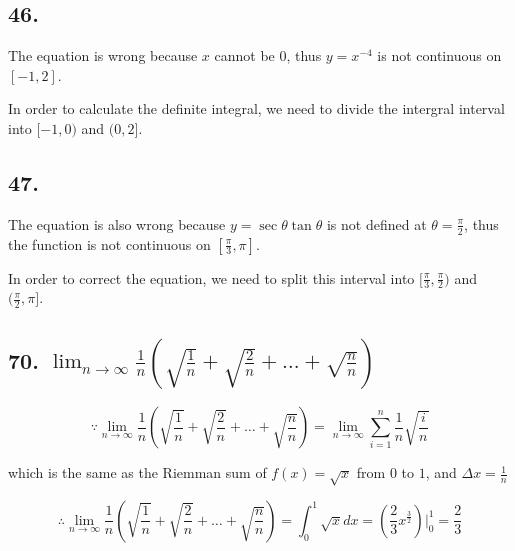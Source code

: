\documentclass{article}
\begin{document}
    \subsection*{46. }

    The equation is wrong because $x$ cannot be $0$, thus $y = x^{-4}$ is not continuous on $[-1, 2]$.

    In order to calculate the definite integral, we need to divide the intergral interval into $[-1, 0)$ and $(0, 2]$.
    
    \subsection*{47. }

    The equation is also wrong because $y = \sec\theta \tan \theta$ is not defined at $\theta = \frac \pi 2$, thus the function is not continuous on $[\frac \pi 3, \pi]$.

    In order to correct the equation, we need to split this interval into $[\frac \pi 3, \frac \pi 2)$ and $(\frac \pi 2, \pi]$.

    \subsection*{70. $\lim_{n \to \infty}\frac 1 n (\sqrt{\frac 1 n} + \sqrt{\frac 2 n} + \dots + \sqrt{\frac n n})$}

    $$\because \lim_{n \to \infty}\frac 1 n (\sqrt{\frac 1 n} + \sqrt{\frac 2 n} + \dots + \sqrt{\frac n n}) = \lim_{n \to \infty}\sum_{i = 1}^n \frac 1 n \sqrt{\frac{i}{n}}$$

    which is the same as the Riemman sum of $f(x) = \sqrt{x}$ from $0$ to $1$, and $\Delta x = \frac{1}{n}$

    $$\therefore \lim_{n \to \infty}\frac 1 n (\sqrt{\frac 1 n} + \sqrt{\frac 2 n} + \dots + \sqrt{\frac n n})  = \int_0^1\sqrt{x}dx = (\frac 2 3 x^{\frac 3 2})|_0^1 = \frac 2 3$$
\end{document}

